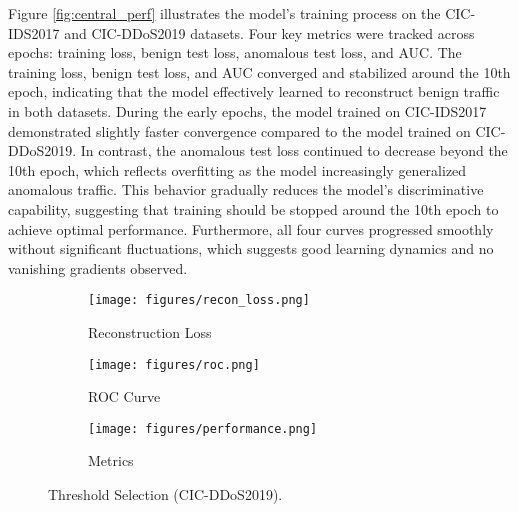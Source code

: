 Figure \ref{fig:central_perf} illustrates the model’s training process on the CIC-IDS2017 and CIC-DDoS2019 datasets. Four key metrics were tracked across epochs: training loss, benign test loss, anomalous test loss, and AUC. The training loss, benign test loss, and AUC converged and stabilized around the 10th epoch, indicating that the model effectively learned to reconstruct benign traffic in both datasets. During the early epochs, the model trained on CIC-IDS2017 demonstrated slightly faster convergence compared to the model trained on CIC-DDoS2019. In contrast, the anomalous test loss continued to decrease beyond the 10th epoch, which reflects overfitting as the model increasingly generalized anomalous traffic. This behavior gradually reduces the model’s discriminative capability, suggesting that training should be stopped around the 10th epoch to achieve optimal performance. Furthermore, all four curves progressed smoothly without significant fluctuations, which suggests good learning dynamics and no vanishing gradients observed.

\begin{figure}[h]
    \centering

    \begin{subfigure}[b]{0.32\textwidth}
        \centering
        \texttt{[image: figures/recon\_loss.png]}
        \caption{Reconstruction Loss}
        \label{fig:threshold_selection_recon}
    \end{subfigure}
    \hfill
    \begin{subfigure}[b]{0.32\textwidth}
        \centering
        \texttt{[image: figures/roc.png]}
        \caption{ROC Curve}
        \label{fig:threshold_selection_roc}
    \end{subfigure}
    \hfill
    \begin{subfigure}[b]{0.32\textwidth}
        \centering
        \texttt{[image: figures/performance.png]}
        \caption{Metrics}
        \label{fig:threshold_selection_metrics}
    \end{subfigure}

    \caption{Threshold Selection (CIC-DDoS2019).}
    \label{fig:threshold_selection}
\end{figure}

